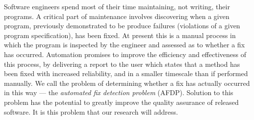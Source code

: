 
Software engineers spend most of their time maintaining, not writing, their programs. A critical part of maintenance involves discovering when a given program, previously demonstrated to be produce failures (violations of a given program specification), has been fixed. 
At present this is a manual process in which the program is 
inspected by the engineer and assessed as to whether a fix has occurred. Automation promises to improve the efficiency and effectiveness of this process, by delivering a report to the user which states that a method has been fixed with increased reliability, and in a smaller timescale than if performed manually. We call the problem of determining whether a fix has actually occurred in this way --- the \textit{automated fix detection problem} (AFDP). Solution to this problem 
has the potential to greatly improve the quality assurance of released software. It is this problem that our research will address. 
